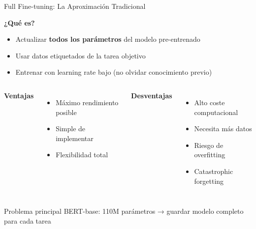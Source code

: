 \begin{frame}{Full Fine-tuning: La Aproximación Tradicional}

\textbf{¿Qué es?}
\begin{itemize}
    \item Actualizar \textbf{todos los parámetros} del modelo pre-entrenado
    \item Usar datos etiquetados de la tarea objetivo
    \item Entrenar con learning rate bajo (no olvidar conocimiento previo)
\end{itemize}

\vspace{0.5em}

\begin{columns}
\textbf{Ventajas}
\begin{itemize}
    \item Máximo rendimiento posible
    \item Simple de implementar
    \item Flexibilidad total
\end{itemize}

\textbf{Desventajas}
\begin{itemize}
    \item Alto coste computacional
    \item Necesita más datos
    \item Riesgo de overfitting
    \item Catastrophic forgetting
\end{itemize}

\end{columns}

\vspace{1em}

\begin{alertblock}{Problema principal}
BERT-base: 110M parámetros → guardar modelo completo para cada tarea
\end{alertblock}

\end{frame}

